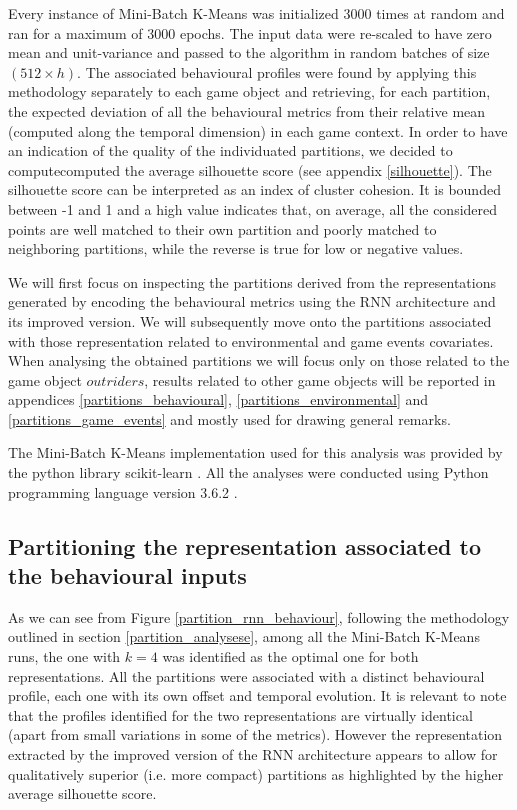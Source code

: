 Every instance of Mini-Batch K-Means was initialized 3000 times at random and ran for a maximum of 3000 epochs. The input data were re-scaled to have zero mean and unit-variance and passed to the algorithm in random batches of size $(512 \times h)$. The associated behavioural profiles were found by applying this methodology separately to each game object and retrieving, for each partition, the expected deviation of all the behavioural metrics from their relative mean (computed along the temporal dimension) in each game context. In order to have an indication of the quality of the individuated partitions, we decided to computecomputed the average silhouette score (see appendix \ref{silhouette}). The silhouette score can be interpreted as an index of cluster cohesion. It is bounded between -1 and 1 and a high value indicates that, on average, all the considered points are well matched to their own partition and poorly matched to neighboring partitions, while the reverse is true for low or negative values. 

We will first focus on inspecting the partitions derived from the representations generated by encoding the behavioural metrics using the RNN architecture and its improved version. We will subsequently move onto the partitions associated with those representation related to environmental and game events covariates. When analysing the obtained partitions we will focus only on those related to the game object $outriders$, results related to other game objects will be reported in appendices \ref{partitions_behavioural}, \ref{partitions_environmental} and \ref{partitions_game_events} and mostly used for drawing general remarks. 

The Mini-Batch K-Means implementation used for this analysis was provided by the python library scikit-learn \cite{scikit-learn}. All the analyses were conducted using Python programming language version 3.6.2 \cite{10.5555/1593511}.

\subsection{Partitioning the representation associated to the behavioural inputs}
\label{partition_behaviour}
As we can see from Figure \ref{partition_rnn_behaviour}, following the methodology outlined in section \ref{partition_analysese}, among all the Mini-Batch K-Means runs, the one with $k=4$ was identified as the optimal one for both representations. All the partitions were associated with a distinct behavioural profile, each one with its own offset and temporal evolution. It is relevant to note that the profiles identified for the two representations are virtually identical (apart from small variations in some of the metrics). However the representation extracted by the improved version of the RNN architecture appears to allow for qualitatively superior (i.e. more compact) partitions as highlighted by the higher average silhouette score.

